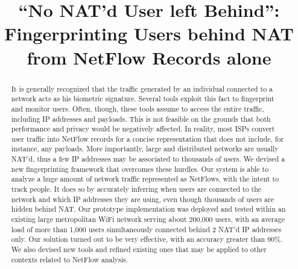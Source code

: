 \documentclass[10pt,conference,compsocconf,letterpaper]{IEEEtran}
\begin{document}
\newtheorem{definition}{Definition}
\newcommand{\nfr}[0]{\textit{nfr}}
\newcommand{\netport}[0]{$\langle\textit{netrange, port}\rangle$}
\newcommand{\fkey}[0]{\ensuremath{f_{\textit{key}}}}

\renewenvironment{description}[1][10pt]
  {\list{}{\labelwidth=0pt \leftmargin=#1
   \let\makelabel\descriptionlabel}}
  {\endlist}

\author{
}

\title{``No NAT'd User left Behind'': Fingerprinting Users behind NAT from NetFlow Records alone}

\maketitle
\begin{abstract}
  It is generally recognized that the traffic generated by an
  individual connected to a network acts as his biometric signature.
  Several tools exploit this fact to fingerprint and monitor users.
  Often, though, these tools assume to access the entire
  traffic, including IP addresses and payloads. This is not feasible 
  on the grounds that both performance and privacy would be negatively affected.
  In reality, most ISPs
  convert user traffic into NetFlow records for a concise
  representation that does not include, for instance, any
  payloads. More importantly, large and distributed networks are usually
  NAT'd, thus a few IP addresses may be associated to thousands of
  users.
  We devised a new fingerprinting framework that overcomes these
  hurdles. Our system is able to analyze a huge amount of network traffic
  represented as NetFlows, with the intent to track people. It does so by accurately 
  inferring when users are connected to the network and which IP addresses they are using,  
  even though thousands of users are hidden behind NAT. Our prototype
  implementation was deployed and tested within an existing large
  metropolitan WiFi network serving about 200,000 users, with an average load of more than 1,000 users simultaneously connected behind 2 NAT'd IP addresses only.  Our solution
  turned out to be very effective, with an accuracy greater than
  90\%.  We also devised new tools and refined existing ones that may
  be applied to other contexts related to NetFlow analysis.

\end{abstract}
\end{document}

